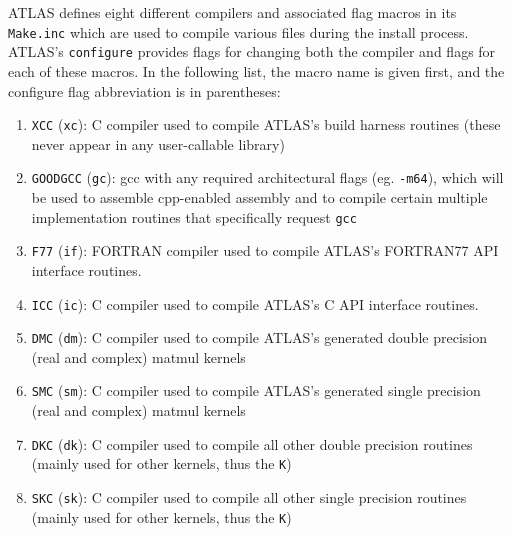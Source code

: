 \documentclass[11pt]{article}
\begin{document}
ATLAS defines eight different compilers and associated flag macros in 
its {\tt Make.inc} which are used to compile various files during the
install process.  ATLAS's {\tt configure} provides flags for changing both the
compiler and flags for each of these macros.  In the following list,
the macro name is given first, and the configure flag abbreviation is in
parentheses:
\begin{enumerate}
\item {\tt XCC} ({\tt xc}): C compiler used to compile ATLAS's build harness routines
                 (these never appear in any user-callable library)
\item {\tt GOODGCC} ({\tt gc}): gcc with any required architectural flags 
      (eg. {\tt -m64}), which will be used to assemble cpp-enabled assembly
      and to compile certain multiple implementation routines that specifically
      request {\tt gcc}
\item {\tt F77} ({\tt if}): FORTRAN compiler used to compile ATLAS's FORTRAN77
                API interface routines.
\item {\tt ICC} ({\tt ic}): C compiler used to compile ATLAS's C API interface
                           routines.
\item {\tt DMC} ({\tt dm}): C compiler used to compile ATLAS's generated
                double precision (real and complex) matmul kernels
\item {\tt SMC} ({\tt sm}): C compiler used to compile ATLAS's generated
                single precision (real and complex) matmul kernels
\item {\tt DKC} ({\tt dk}): C compiler used to compile all other double
                precision routines (mainly used for other kernels, thus the
                {\tt K})
\item {\tt SKC} ({\tt sk}): C compiler used to compile all other single
                precision routines (mainly used for other kernels,
                thus the {\tt K})
\end{enumerate}
\end{document}
